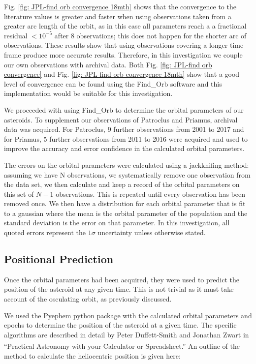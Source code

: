\documentclass[10pt, twocolumn]{revtex4}    %
\begin{document}
Fig. \ref{fig: JPL-find orb convergence 18mth} shows that the convergence to the literature values is greater and faster when using observations taken from a greater arc length of the orbit, as in this case all parameters reach a a fractional residual $<10^{-5}$ after 8 observations; this does not happen for the shorter arc of observations. These results show that using observations covering a longer time frame produce more accurate results. Therefore, in this investigation we couple our own observations with archival data. Both Fig. \ref{fig: JPL-find orb convergence} and Fig. \ref{fig: JPL-find orb convergence 18mth} show that a good level of convergence can be found using the Find\_Orb software and this implementation would be suitable for this investigation.

We proceeded with using Find\_Orb to determine the orbital parameters of our asteroids. To supplement our observations of Patroclus and Priamus, archival data was acquired. For Patroclus, 9 further observations from 2001 to 2017 and for Priamus, 5 further observations from 2011 to 2016 were acquired and used to improve the accuracy and error confidence in the calculated orbital parameters.

The errors on the orbital parameters were calculated using a jackknifing method: assuming we have N observations, we systematically remove one observation from the data set, we then calculate and keep a record of the orbital parameters on this set of $N-1$ observations. This is repeated until every observation has been removed once. We then have  a distribution for each orbital parameter that is fit to a gaussian where the mean is the orbital parameter of the population and the standard deviation is the error on that parameter. In this investigation, all quoted errors represent the $1\sigma$ uncertainty unless otherwise stated.

\subsection*{Positional Prediction}

Once the orbital parameters had been acquired, they were used to predict the position of the asteroid at any given time. This is not trivial as it must take account of the osculating orbit, as previously discussed.

We used the Pyephem python package with the calculated orbital parameters and epochs to determine the position of the asteroid at a given time. The specific algorithms are described in detail by Peter Duffett-Smith and Jonathan Zwart in ``Practical Astronomy with your Calculator or Spreadsheet.''\textsuperscript{\cite[p.121-130]{Duffett-SmithPracticalastronomyyour2011}} An outline of the method to calculate the heliocentric position is given here:
\end{document}

